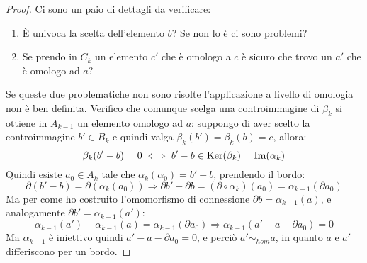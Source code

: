 \begin{proof}
  Ci sono un paio di dettagli da verificare:
  \begin{enumerate}
  \item È univoca la scelta dell'elemento $ b $? Se non lo è ci sono
    problemi?
  \item Se prendo in $ C_k $ un elemento $ c' $ che è omologo
    a $ c $ è sicuro che trovo un $ a' $ che è
    omologo ad $ a $?
  \end{enumerate}
  Se queste due problematiche non sono risolte l'applicazione a livello di
  omologia non è ben definita. Verifico che comunque scelga una controimmagine
  di $ \beta_k $ si ottiene in $ A_{k-1} $ un elemento omologo ad $ a $: suppongo di
  aver scelto la controimmagine $ b' \in B_k $ e quindi valga
  $ \beta_k (b') = \beta_k (b) = c $, allora:
  \[
    \beta_k(b' - b) = 0 \iff b' - b \in \mathrm{Ker}( \beta_k) = \mathrm{Im}( \alpha_k )
  \]
  Quindi esiste $ a_0 \in A_k $ tale che $ \alpha_k(\alpha_0) = b' - b $, prendendo
  il bordo:
  \[
    \partial ( b' - b ) = \partial ( \alpha_k (a_0 )) \Rightarrow \partial b' - \partial b = (\partial \circ \alpha_k)(a_0) = \alpha_{k-1}(\partial a_0)
  \]
  Ma per come ho costruito l'omomorfismo di connessione $ \partial b = \alpha_{k-1}(a) $,
  e analogamente $ \partial b' = \alpha_{k-1}(a') $:
  \[
    \alpha_{k-1}(a') - \alpha_{k-1}(a) = \alpha_{k-1}(\partial a_0) \Rightarrow \alpha_{k-1}(a' - a - \partial a_0) = 0
  \]
  Ma $ \alpha_{k-1} $ è iniettivo quindi $ a' - a - \partial a_0 = 0 $, e perciò  $ a' \sim_{hom} a $,
  in quanto $ a $ e $ a' $ differiscono per un bordo.


\end{proof}
